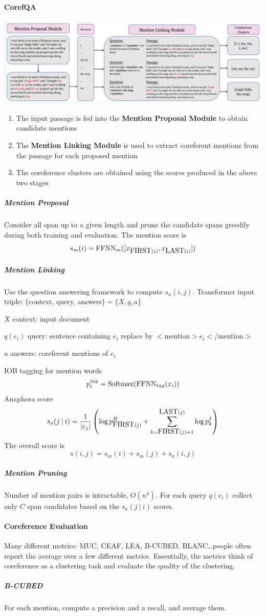 \documentclass[10pt]{report}
\begin{document}
\paragraph{CorefQA}
\begin{center}
	\includegraphics[scale=0.5]{114.png}
\end{center}
\begin{enumerate}
	\item The input passage is fed into the \textbf{Mention Proposal Module} to obtain candidate mentions
	\item The \textbf{Mention Linking Module} is used to extract coreferent mentions from the passage for each proposed mention
	\item The coreference clusters are obtained using the scores produced in the above two stages
\end{enumerate}
\subparagraph{Mention Proposal} Consider all span up to a given length and prune the candidate spans greedily during both training and evaluation. The mention score is $$s_m(i) = \hbox{FFNN}_m([x_{\hbox{FIRST}(i)}, x_{\hbox{LAST}(i)}])$$
\subparagraph{Mention Linking} Use the question answering framework to compute $s_a(i,j)$. Transformer input triple: $\{$context, query, answers$\}=\{X,q,a\}$\begin{list}{}{}
	\item $X$ context: input document
	\item $q(e_i)$ query: sentence containing $e_i$ replace by $<$mention$>e_i<$/mention$>$
	\item $a$ answers: coreferent mentions of $e_i$
\end{list}
IOB tagging for mention words $$p_i^{tag}=\hbox{Softmax}(\hbox{FFNN}_{tag}(x_i))$$
Anaphora score $$s_a(j\:|\:i) = \frac{1}{|e_j|}\left(\log p^B_{\hbox{FIRST}(j)}+\sum_{k=\hbox{FIRST}(j)+1}^{\hbox{LAST}(j)} \log p_k^I\right)$$
The overall score is $$s(i,j) = s_m(i) + s_m(j) + s_a(i,j)$$
\subparagraph{Mention Pruning} Number of mention pairs is intractable, $O(n^4)$. For each query $q(e_i)$ collect only $C$ span candidates based on the $s_a(j\:|\:i)$ scores.
\paragraph{Coreference Evaluation} Many different metrics: MUC, CEAF, LEA, B-CUBED, BLANC\ldots people often report the average over a few different metrics. Essentially, the metrics think of coreference as a clustering task and evaluate the quality of the clustering.
\subparagraph{B-CUBED} For each mention, compute a precision and a recall, and average them.
\end{document}
